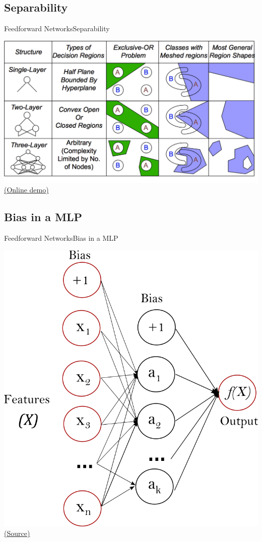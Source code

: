 \documentclass[10pt,compress]{beamer} %
\begin{document}
\subsection{Separability}
\begin{frame}{Feedforward Networks}{Separability}
    \begin{center}
	    \includegraphics[width=0.9\linewidth]{figs/sep.png}\\
		\href{http://playground.tensorflow.org/}{(Online demo)}
    \end{center}
\end{frame}

\subsection{Bias in a MLP}
\begin{frame}{Feedforward Networks}{Bias in a MLP}
    \begin{center}
	    \includegraphics[width=0.6\paperheight]{figs/bias.png}\\
		\tiny \href{https://scikit-learn.org/stable/modules/neural\_networks\_supervised.html}{(Source)}
    \end{center}
\end{frame}
\end{document}
